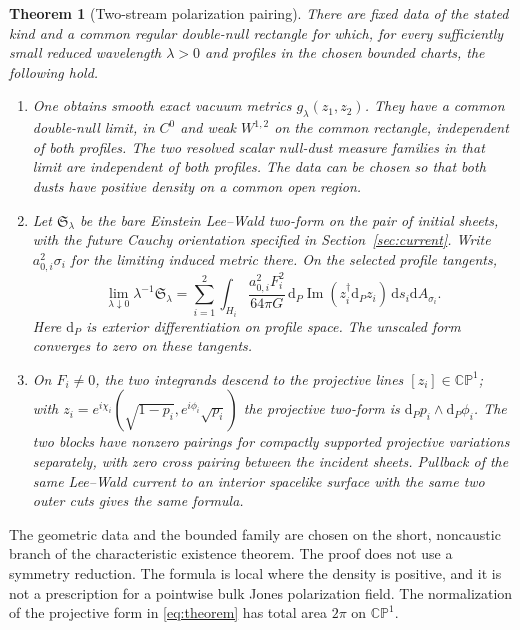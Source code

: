 \documentclass[11pt]{article}
\newtheorem{theorem}{Theorem}
\newcommand{\im}{\operatorname{Im}}
\newcommand{\dd}{\mathrm d}
\begin{document}
\begin{theorem}[Two-stream polarization pairing]\label{thm:main}
There are fixed data of the stated kind and a common
regular double-null rectangle for which, for every
sufficiently small reduced wavelength \(\lambda>0\) and profiles
in the chosen bounded charts, the following hold.
\begin{enumerate}
\item One obtains smooth exact vacuum metrics \(g_\lambda(z_1,z_2)\).
They have a common double-null limit, in \(C^0\) and weak
\(W^{1,2}\) on the common rectangle, independent of both
profiles. The two resolved scalar null-dust measure
families in that limit are independent of both profiles.
The data can be chosen so that both dusts have positive
density on a common open region.
\item Let \(\mathfrak S_\lambda\) be the bare Einstein
Lee--Wald two-form on the pair of initial sheets, with the
future Cauchy orientation specified in
Section~\ref{sec:current}. Write \(a_{0,i}^2\sigma_i\)
for the limiting induced metric there. On the selected
profile tangents,
\begin{equation}\label{eq:theorem}
 \lim_{\lambda\downarrow0}\lambda^{-1}\mathfrak S_\lambda
 =\sum_{i=1}^2\int_{H_i}
     \frac{a_{0,i}^2 F_i^2}{64\pi G}\,
     \dd_{\!P}\im(z_i^\dagger\dd_{\!P}z_i)\,
     \dd s_i\dd A_{\sigma_i}.
\end{equation}
Here \(\dd_{\!P}\) is exterior differentiation on profile
space. The unscaled form converges to zero on these tangents.
\item On \(F_i\ne0\), the two integrands descend to the
projective lines \([z_i]\in\mathbb{CP}^1\); with
\(z_i=e^{i\chi_i}(\sqrt{1-p_i},e^{i\phi_i}\sqrt{p_i})\)
the projective two-form is
\(\dd_{\!P}p_i\wedge\dd_{\!P}\phi_i\).
The two blocks have nonzero pairings for compactly
supported projective variations separately, with zero
cross pairing between the incident sheets. Pullback of the
same Lee--Wald current to an interior spacelike surface
with the same two outer cuts gives the same formula.
\end{enumerate}
\end{theorem}

The geometric data and the bounded family are chosen
on the short, noncaustic branch of the characteristic
existence theorem. The proof does not use a symmetry
reduction. The formula is local where the density is
positive, and it is not a prescription for a pointwise
bulk Jones polarization field. The normalization of
the projective form in \eqref{eq:theorem} has total
area \(2\pi\) on \(\mathbb{CP}^1\).
\end{document}

